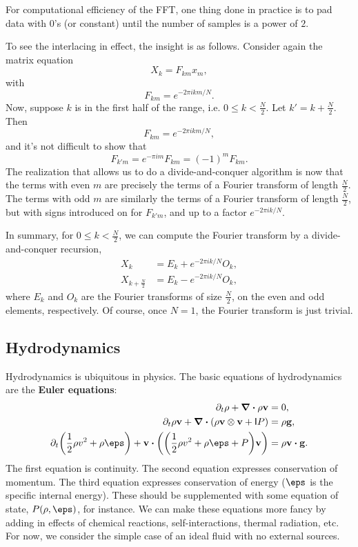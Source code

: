 \documentclass[12pt,letterpaper]{article}
\begin{document}
For computational efficiency of the FFT, one thing done in practice is to pad data with $0$'s (or constant) until the number of samples is a power of $2$.

To see the interlacing in effect, the insight is as follows. Consider again the matrix equation
\[X_k=F_{km}x_m,\]
with
\[F_{km}=e^{-2\pi ikm/N}.\]
Now, suppose $k$ is in the first half of the range, i.e. $0\leq k<\frac N2$. Let $k'=k+\frac N2$. Then
\[F_{km}=e^{-2\pi ikm/N},\]
and it's not difficult to show that
\[F_{k'm}=e^{-\pi im}F_{km}=(-1)^mF_{km}.\]
The realization that allows us to do a divide-and-conquer algorithm is now that the terms with even $m$ are precisely the terms of a Fourier transform of length $\frac N2$. The terms with odd $m$ are similarly the terms of a Fourier transform of length $\frac N2$, but with signs introduced on for $F_{k'm}$, and up to a factor $e^{-2\pi ik/N}$.

In summary, for $0\leq k<\frac N2$, we can compute the Fourier transform by a divide-and-conquer recursion,
\begin{align*}
    X_k&=E_k+e^{-2\pi ik/N}O_k,\\
    X_{k+\frac N2}&=E_k-e^{-2\pi ik/N}O_k,
\end{align*}
where $E_k$ and $O_k$ are the Fourier transforms of size $\frac N2$, on the even and odd elements, respectively. Of course, once $N=1$, the Fourier transform is just trivial.
\subsection{Hydrodynamics}
Hydrodynamics is ubiquitous in physics. The basic equations of hydrodynamics are the \textbf{Euler equations}:
\begin{align*}
    \partial_t\rho+\div{\rho\vb{v}}&=0,\\
    \partial_t\rho\vb{v}+\div(\rho\vb{v}\otimes\vb{v}+\mathsf{I}P)&=\rho\vb g,\\
    \partial_t\qty(\frac12\rho v^2+\rho\eps)+\vb v\vdot\qty(\qty(\frac12\rho v^2+\rho\eps+P)\vb{v})&=\rho\vb v\vdot\vb g.
\end{align*}
The first equation is continuity. The second equation expresses conservation of momentum. The third equation expresses conservation of energy ($\eps$ is the specific internal energy). These should be supplemented with some equation of state, $P(\rho,\eps)$, for instance. We can make these equations more fancy by adding in effects of chemical reactions, self-interactions, thermal radiation, etc. For now, we consider the simple case of an ideal fluid with no external sources.
\end{document}
